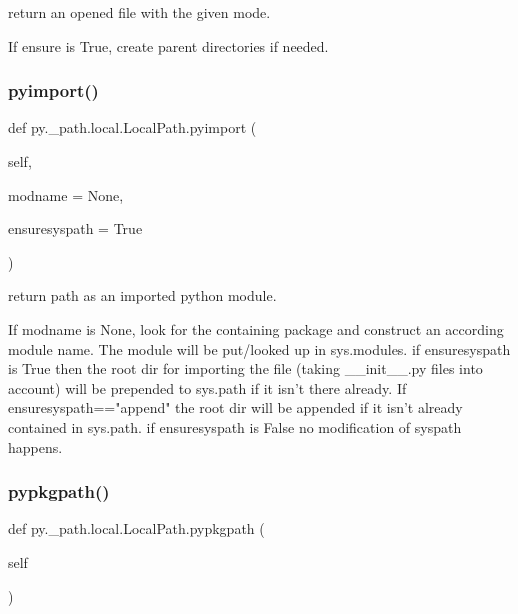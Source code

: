 \begin{DoxyVerb}return an opened file with the given mode.

If ensure is True, create parent directories if needed.
\end{DoxyVerb}
 \mbox{\label{classpy_1_1__path_1_1local_1_1_local_path_a11890707d68a8a40601711a5809411e8}} 
\subsubsection{\texorpdfstring{pyimport()}{pyimport()}}
{\footnotesize\ttfamily def py.\+\_\+path.\+local.\+Local\+Path.\+pyimport (\begin{DoxyParamCaption}\item[{}]{self,  }\item[{}]{modname = {\ttfamily None},  }\item[{}]{ensuresyspath = {\ttfamily True} }\end{DoxyParamCaption})}

\begin{DoxyVerb}return path as an imported python module.

If modname is None, look for the containing package
and construct an according module name.
The module will be put/looked up in sys.modules.
if ensuresyspath is True then the root dir for importing
the file (taking __init__.py files into account) will
be prepended to sys.path if it isn't there already.
If ensuresyspath=="append" the root dir will be appended
if it isn't already contained in sys.path.
if ensuresyspath is False no modification of syspath happens.
\end{DoxyVerb}
 \mbox{\label{classpy_1_1__path_1_1local_1_1_local_path_ae5c00220136db5d72de6a9a282f6a8a6}} 
\subsubsection{\texorpdfstring{pypkgpath()}{pypkgpath()}}
{\footnotesize\ttfamily def py.\+\_\+path.\+local.\+Local\+Path.\+pypkgpath (\begin{DoxyParamCaption}\item[{}]{self }\end{DoxyParamCaption})}

